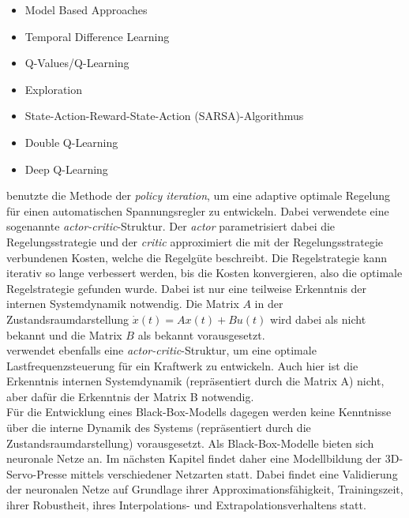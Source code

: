 \begin{itemize}
	\item Model Based Approaches
	\item Temporal Difference Learning
	\item Q-Values/Q-Learning
	\item Exploration
	\item State-Action-Reward-State-Action (SARSA)-Algorithmus
	\item Double Q-Learning
	\item Deep Q-Learning
\end{itemize}

\cite{Prasad.2014} benutzte die Methode der \textit{policy iteration}, um eine adaptive optimale Regelung für einen automatischen Spannungsregler zu entwickeln. Dabei verwendete \cite{Prasad.2014} eine sogenannte \textit{actor-critic}-Struktur. Der \textit{actor} parametrisiert dabei die Regelungsstrategie und der \textit{critic} approximiert die mit der Regelungsstrategie verbundenen Kosten, welche die Regelgüte beschreibt. Die Regelstrategie kann iterativ so lange verbessert werden, bis die Kosten konvergieren, also die optimale Regelstrategie gefunden wurde. Dabei ist nur eine teilweise Erkenntnis der internen Systemdynamik notwendig. Die Matrix $A$ in der Zustandsraumdarstellung $\dot{x}(t) = A x(t) + B u(t) $ wird dabei als nicht bekannt und die Matrix $B$ als bekannt vorausgesetzt. \\
\cite{Vrabie.2009} verwendet ebenfalls eine \textit{actor-critic}-Struktur, um eine optimale Lastfrequenzsteuerung für ein Kraftwerk zu entwickeln. Auch hier ist die Erkenntnis internen Systemdynamik (repräsentiert durch die Matrix A) nicht, aber dafür die Erkenntnis der Matrix B notwendig.\\

Für die Entwicklung eines Black-Box-Modells dagegen werden keine Kenntnisse über die interne Dynamik des Systems (repräsentiert durch die Zustandsraumdarstellung) vorausgesetzt. Als Black-Box-Modelle bieten sich neuronale Netze an. Im nächsten Kapitel findet daher eine Modellbildung der 3D-Servo-Presse mittels verschiedener Netzarten statt. Dabei findet eine Validierung der neuronalen Netze auf Grundlage ihrer Approximationsfähigkeit, Trainingszeit, ihrer Robustheit, ihres Interpolations- und Extrapolationsverhaltens statt. 



 






